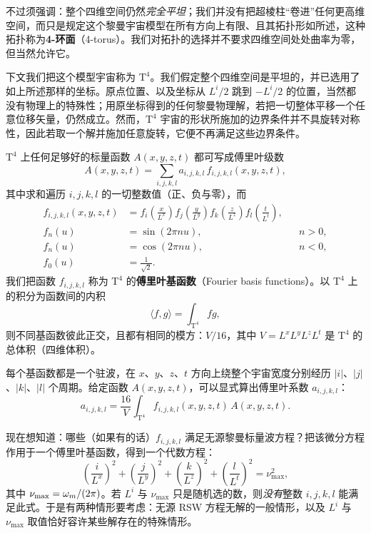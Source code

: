 不过须强调：整个四维空间仍然\emph{完全平坦}；我们并没有把超棱柱“卷进”任何更高维空间，而只是规定这个黎曼宇宙模型在所有方向上有限、且其拓扑形如所述，这种拓扑称为\textbf{4-环面}（4-torus）。我们对拓扑的选择并不要求四维空间处处曲率为零，但当然允许它。

下文我们把这个模型宇宙称为 $\text{T}^{4}$。我们假定整个四维空间是平坦的，并已选用了如上所述那样的坐标。原点位置、以及坐标从 $L^{i}/2$ 跳到 $-L^{i}/2$ 的位置，当然都没有物理上的特殊性；用原坐标得到的任何黎曼物理解，若把一切整体平移一个任意位移矢量，仍然成立。然而，$\text{T}^{4}$ 宇宙的形状所施加的边界条件并不具旋转对称性，因此若取一个解并施加任意旋转，它便不再满足这些边界条件。

$\text{T}^{4}$ 上任何足够好的标量函数 $A(x,y,z,t)$ 都可写成傅里叶级数
\begin{equation}
A(x,y,z,t) = \sum_{i,j,k,l} a_{i,j,k,l}\, f_{i,j,k,l}(x,y,z,t),
\end{equation}
其中求和遍历 $i,j,k,l$ 的一切整数值（正、负与零），而
\begin{align}
f_{i,j,k,l}(x,y,z,t) &= f_{i}\!\left(\frac{x}{L^{x}}\right) f_{j}\!\left(\frac{y}{L^{y}}\right) f_{k}\!\left(\frac{z}{L^{z}}\right) f_{l}\!\left(\frac{t}{L^{t}}\right),\\
f_{n}(u) &= \sin(2\pi n u), && n>0,\\
f_{n}(u) &= \cos(2\pi n u), && n<0,\\
f_{0}(u) &= \frac{1}{\sqrt2}.
\end{align}
我们把函数 $f_{i,j,k,l}$ 称为 $\text{T}^{4}$ 的\textbf{傅里叶基函数}（Fourier basis functions）。以 $\text{T}^{4}$ 上的积分为函数间的内积
\begin{equation}
\langle f,g\rangle = \int_{\text{T}^{4}} fg,
\end{equation}
则不同基函数彼此正交，且都有相同的模方：$V/16$，其中 $V=L^{x}L^{y}L^{z}L^{t}$ 是 $\text{T}^{4}$ 的总体积（四维体积）。

每个基函数都是一个驻波，在 $x$、$y$、$z$、$t$ 方向上绕整个宇宙宽度分别经历 $|i|$、$|j|$、$|k|$、$|l|$ 个周期。给定函数 $A(x,y,z,t)$，可以显式算出傅里叶系数 $a_{i,j,k,l}$：
\begin{equation}
a_{i,j,k,l} = \frac{16}{V}\int_{\text{T}^{4}} f_{i,j,k,l}(x,y,z,t)\,A(x,y,z,t).
\end{equation}

现在想知道：哪些（如果有的话）$f_{i,j,k,l}$ 满足无源黎曼标量波方程？把该微分方程作用于一个傅里叶基函数，得到一个代数方程：
\begin{equation}
\left(\frac{i}{L^{x}}\right)^{2}+\left(\frac{j}{L^{y}}\right)^{2}+\left(\frac{k}{L^{z}}\right)^{2}+\left(\frac{l}{L^{t}}\right)^{2} = \nu_{\max}^{2},
\end{equation}
其中 $\nu_{\max}=\omega_m/(2\pi)$。若 $L^{i}$ 与 $\nu_{\max}$ 只是随机选的数，则\emph{没有}整数 $i,j,k,l$ 能满足此式。于是有两种情形要考虑：无源 RSW 方程无解的一般情形，以及 $L^{i}$ 与 $\nu_{\max}$ 取值恰好容许某些解存在的特殊情形。

